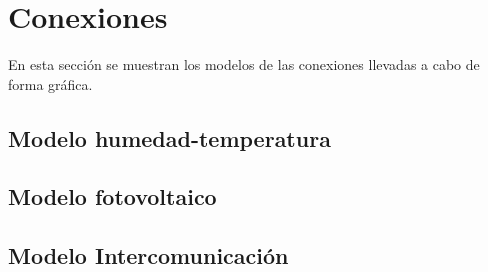 \section{Conexiones}\label{sec:conexiones}

En esta secci\'on se muestran los modelos de las conexiones llevadas a
cabo de forma gr\'afica.

\subsection{Modelo humedad-temperatura}
\begin{figure}\label{fig:dht22}

\end{figure}
\subsection{Modelo fotovoltaico}
\begin{figure}\label{fig:bh1750}

\end{figure}
\subsection{Modelo Intercomunicaci\'on}
